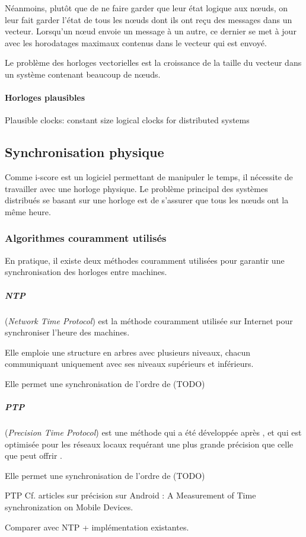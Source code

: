 Néanmoins, plutôt que de ne faire garder que leur état logique aux nœuds, on leur fait garder l'état de tous les nœuds dont ils ont reçu des messages dans un vecteur. Lorsqu'un nœud envoie un message à un autre, ce dernier se met à jour avec les horodatages maximaux contenus dans le vecteur qui est envoyé.

Le problème des horloges vectorielles est la croissance de la taille du vecteur dans un système contenant beaucoup de nœuds.

\paragraph{Horloges plausibles}
Plausible clocks: constant size logical clocks for distributed systems

\subsection{Synchronisation physique}
Comme i-score est un logiciel permettant de manipuler le temps, il nécessite de travailler avec une horloge physique. Le problème principal des systèmes distribués se basant sur une horloge est de s'assurer que tous les nœuds ont la même heure.

\subsubsection{Algorithmes couramment utilisés}
En pratique, il existe deux méthodes couramment utilisées pour garantir une synchronisation des horloges entre machines.

\subparagraph{NTP} (\textit{Network Time Protocol}) est la méthode couramment utilisée sur Internet pour synchroniser l'heure des machines.

Elle emploie une structure en arbres avec plusieurs niveaux, chacun communiquant uniquement avec ses niveaux supérieurs et inférieurs.

Elle permet une synchronisation de l'ordre de (TODO)
\subparagraph{PTP} (\textit{Precision Time Protocol}) est une méthode qui a été développée après , et qui est optimisée pour les réseaux locaux requérant une plus grande précision que celle que peut offrir .

Elle permet une synchronisation de l'ordre de (TODO)

\ac{PTP}
Cf. articles sur précision sur Android : 
A Measurement of Time synchronization on Mobile Devices.

Comparer avec NTP + implémentation existantes.


